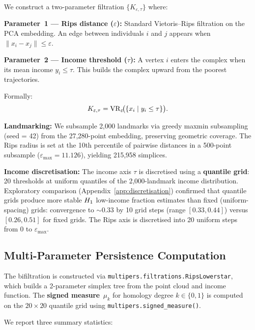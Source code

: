 We construct a two-parameter filtration $\{K_{\varepsilon, \tau}\}$ where:

\textbf{Parameter~1 --- Rips distance ($\varepsilon$):} Standard
Vietoris--Rips filtration on the PCA embedding. An edge between individuals
$i$ and $j$ appears when $\|x_i - x_j\| \leq \varepsilon$.

\textbf{Parameter~2 --- Income threshold ($\tau$):} A vertex $i$ enters the
complex when its mean income $y_i \leq \tau$. This builds the complex upward
from the poorest trajectories.

Formally:
\begin{equation}
  K_{\varepsilon, \tau}
  = \mathrm{VR}_\varepsilon\!\bigl(\{x_i \mid y_i \leq \tau\}\bigr).
  \label{eq:bifiltration}
\end{equation}

\textbf{Landmarking:} We subsample 2,000 landmarks via greedy maxmin
subsampling (seed = 42) from the 27,280-point embedding, preserving
geometric coverage. The Rips radius is set at the 10th percentile of
pairwise distances in a 500-point subsample
($\varepsilon_\text{max} = 11.126$), yielding 215,958 simplices.

\textbf{Income discretisation:} The income axis $\tau$ is discretised using a
\textbf{quantile grid}: 20 thresholds at uniform quantiles of the
2,000-landmark income distribution. Exploratory comparison
(Appendix~\ref{app:discretisation}) confirmed that quantile grids produce
more stable $H_{1}$ low-income fraction estimates than fixed
(uniform-spacing) grids: convergence to ${\sim}0.33$ by 10 grid steps (range
$[0.33, 0.44]$) versus $[0.26, 0.51]$ for fixed grids. The Rips axis is
discretised into 20 uniform steps from 0 to $\varepsilon_\text{max}$.

\subsection{Multi-Parameter Persistence Computation}

The bifiltration is constructed via
\texttt{multipers.filtrations.RipsLowerstar}, which builds a 2-parameter
simplex tree from the point cloud and income function. The \textbf{signed
measure}~$\mu_k$ for homology degree $k \in \{0, 1\}$ is computed on the
$20 \times 20$ quantile grid using \texttt{multipers.signed\_measure()}.

We report three summary statistics:

